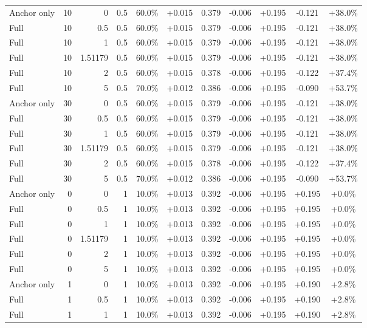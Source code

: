 \begin{table}[htbp]
\begin{tabular}{lrrrccccccc}
Anchor only & 10 & 0 & 0.5 & 60.0\% & +0.015 & 0.379 & -0.006 & +0.195 & -0.121 & +38.0\% \\
Full & 10 & 0.5 & 0.5 & 60.0\% & +0.015 & 0.379 & -0.006 & +0.195 & -0.121 & +38.0\% \\
Full & 10 & 1 & 0.5 & 60.0\% & +0.015 & 0.379 & -0.006 & +0.195 & -0.121 & +38.0\% \\
Full & 10 & 1.51179 & 0.5 & 60.0\% & +0.015 & 0.379 & -0.006 & +0.195 & -0.121 & +38.0\% \\
Full & 10 & 2 & 0.5 & 60.0\% & +0.015 & 0.378 & -0.006 & +0.195 & -0.122 & +37.4\% \\
Full & 10 & 5 & 0.5 & 70.0\% & +0.012 & 0.386 & -0.006 & +0.195 & -0.090 & +53.7\% \\
Anchor only & 30 & 0 & 0.5 & 60.0\% & +0.015 & 0.379 & -0.006 & +0.195 & -0.121 & +38.0\% \\
Full & 30 & 0.5 & 0.5 & 60.0\% & +0.015 & 0.379 & -0.006 & +0.195 & -0.121 & +38.0\% \\
Full & 30 & 1 & 0.5 & 60.0\% & +0.015 & 0.379 & -0.006 & +0.195 & -0.121 & +38.0\% \\
Full & 30 & 1.51179 & 0.5 & 60.0\% & +0.015 & 0.379 & -0.006 & +0.195 & -0.121 & +38.0\% \\
Full & 30 & 2 & 0.5 & 60.0\% & +0.015 & 0.378 & -0.006 & +0.195 & -0.122 & +37.4\% \\
Full & 30 & 5 & 0.5 & 70.0\% & +0.012 & 0.386 & -0.006 & +0.195 & -0.090 & +53.7\% \\
Anchor only & 0 & 0 & 1 & 10.0\% & +0.013 & 0.392 & -0.006 & +0.195 & +0.195 & +0.0\% \\
Full & 0 & 0.5 & 1 & 10.0\% & +0.013 & 0.392 & -0.006 & +0.195 & +0.195 & +0.0\% \\
Full & 0 & 1 & 1 & 10.0\% & +0.013 & 0.392 & -0.006 & +0.195 & +0.195 & +0.0\% \\
Full & 0 & 1.51179 & 1 & 10.0\% & +0.013 & 0.392 & -0.006 & +0.195 & +0.195 & +0.0\% \\
Full & 0 & 2 & 1 & 10.0\% & +0.013 & 0.392 & -0.006 & +0.195 & +0.195 & +0.0\% \\
Full & 0 & 5 & 1 & 10.0\% & +0.013 & 0.392 & -0.006 & +0.195 & +0.195 & +0.0\% \\
Anchor only & 1 & 0 & 1 & 10.0\% & +0.013 & 0.392 & -0.006 & +0.195 & +0.190 & +2.8\% \\
Full & 1 & 0.5 & 1 & 10.0\% & +0.013 & 0.392 & -0.006 & +0.195 & +0.190 & +2.8\% \\
Full & 1 & 1 & 1 & 10.0\% & +0.013 & 0.392 & -0.006 & +0.195 & +0.190 & +2.8\% \\

\end{tabular}
\end{table}
